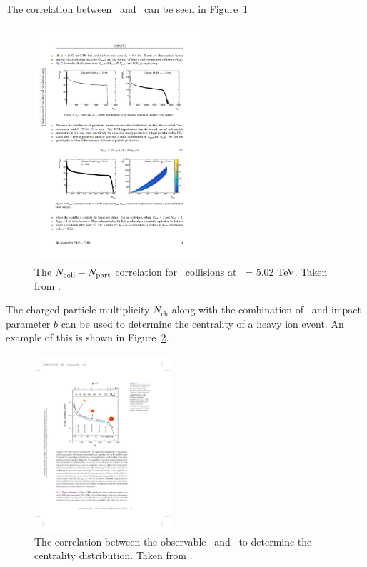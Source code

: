 The correlation between \Ncoll\ and \Npart\ can be seen in Figure~\ref{fig:NcollNpart}

\begin{figure}[htbp]
\begin{center}
\includegraphics[width=0.55\textwidth]{figures/theory/NcollNpart}
\caption{The $\mbox{$N_{\mathrm{coll}}$}-\mbox{$N_{\mathrm{part}}$}$ correlation for \pbpb\ collisions at \sqrtsnn\ = 5.02 TeV. Taken from \cite{Perepelitsa:2212936}. }
\label{fig:NcollNpart}
\end{center}
\end{figure}

The charged particle multiplicity $N_{\mathrm{ch}}$ along with the combination of \Npart\ and impact parameter $b$ can be used to determine the centrality of a heavy ion event. An example of this is shown in Figure~\ref{fig:cent_estimate}.


\begin{figure}[htbp]
\begin{center}
\includegraphics[width=0.45\textwidth]{figures/theory/cent_estimate}
\caption{The correlation between the observable \Nch\ and \Npart\ to determine the centrality distribution. Taken from \cite{doi:10.1146/annurev.nucl.57.090506.123020}. }
\label{fig:cent_estimate}
\end{center}
\end{figure}

